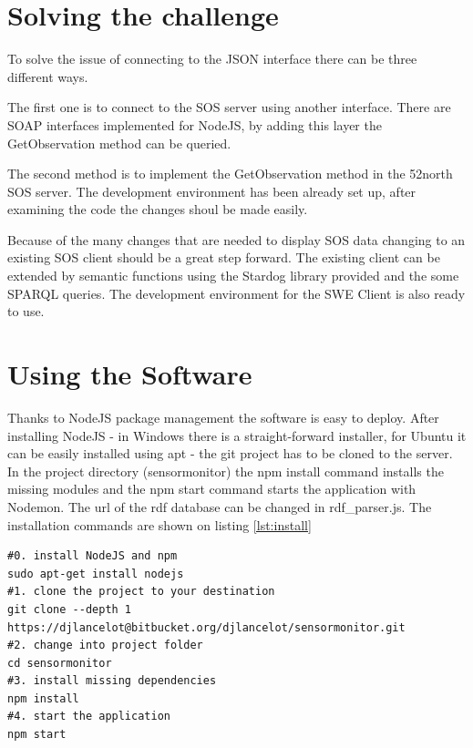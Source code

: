 \section{Solving the challenge}

To solve the issue of connecting to the JSON interface there can be three different ways. 

The first one is to connect to the SOS server using another interface. There are SOAP interfaces implemented for NodeJS, by adding this layer the GetObservation method can be queried.

The second method is to implement the GetObservation method in the 52north SOS server. The development environment has been already set up, after examining the code the changes shoul be made easily. 

Because of the many changes that are needed to display SOS data changing to an existing SOS client should be a great step forward. The existing client can be extended by semantic functions using the Stardog library provided and the some SPARQL queries. The development environment for the SWE Client is also ready to use.

\section{Using the Software}

Thanks to NodeJS package management the software is easy to deploy. After installing NodeJS - in Windows there is a straight-forward installer, for Ubuntu it can be easily installed using apt - the git project has to be cloned to the server. In the project directory (sensormonitor)  the npm install command installs the missing modules and the npm start command starts the application with Nodemon. The url of the rdf database can be changed in rdf\_parser.js. The installation commands are shown on listing \ref{lst:install}

\begin{lstlisting}[caption={Install steps for the software\label{lst:install}}]
#0. install NodeJS and npm
sudo apt-get install nodejs
#1. clone the project to your destination
git clone --depth 1 https://djlancelot@bitbucket.org/djlancelot/sensormonitor.git
#2. change into project folder
cd sensormonitor
#3. install missing dependencies
npm install
#4. start the application
npm start
\end{lstlisting}